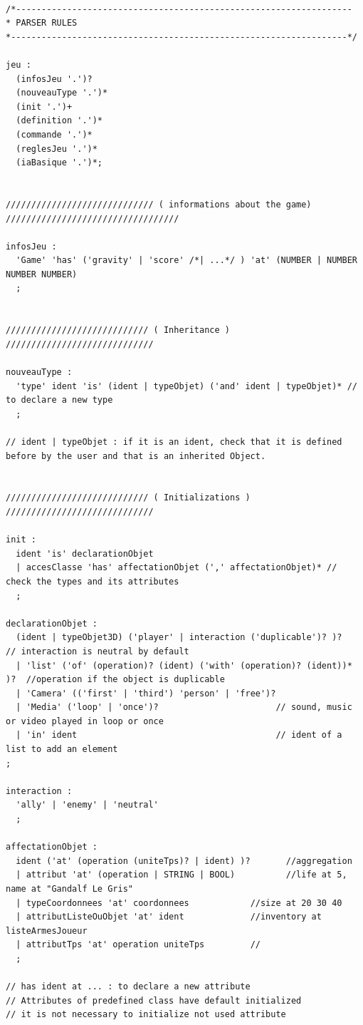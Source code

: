 \begin{lstlisting}[language=Grammar]

/*------------------------------------------------------------------
* PARSER RULES
*------------------------------------------------------------------*/
 
jeu :
  (infosJeu '.')?
  (nouveauType '.')*
  (init '.')+
  (definition '.')*
  (commande '.')*
  (reglesJeu '.')*
  (iaBasique '.')*;
 

///////////////////////////// ( informations about the game)  //////////////////////////////////

infosJeu :
  'Game' 'has' ('gravity' | 'score' /*| ...*/ ) 'at' (NUMBER | NUMBER NUMBER NUMBER)
  ;

 
//////////////////////////// ( Inheritance )  /////////////////////////////
 
nouveauType :
  'type' ident 'is' (ident | typeObjet) ('and' ident | typeObjet)* // to declare a new type
  ;            
  
// ident | typeObjet : if it is an ident, check that it is defined before by the user and that is an inherited Object.

 
//////////////////////////// ( Initializations )  /////////////////////////////

init :
  ident 'is' declarationObjet
  | accesClasse 'has' affectationObjet (',' affectationObjet)* // check the types and its attributes
  ;
 
declarationObjet :
  (ident | typeObjet3D) ('player' | interaction ('duplicable')? )?         // interaction is neutral by default
  | 'list' ('of' (operation)? (ident) ('with' (operation)? (ident))* )?  //operation if the object is duplicable
  | 'Camera' (('first' | 'third') 'person' | 'free')?
  | 'Media' ('loop' | 'once')? 						 // sound, music or video played in loop or once
  | 'in' ident 				                         // ident of a list to add an element
;           
 
interaction :
  'ally' | 'enemy' | 'neutral'
  ;
 
affectationObjet :
  ident ('at' (operation (uniteTps)? | ident) )?       //aggregation
  | attribut 'at' (operation | STRING | BOOL)          //life at 5, name at "Gandalf Le Gris"
  | typeCoordonnees 'at' coordonnees            //size at 20 30 40
  | attributListeOuObjet 'at' ident             //inventory at listeArmesJoueur
  | attributTps 'at' operation uniteTps         //
  ;
 
// has ident at ... : to declare a new attribute
// Attributes of predefined class have default initialized
// it is not necessary to initialize not used attribute
  

\end{lstlisting}

